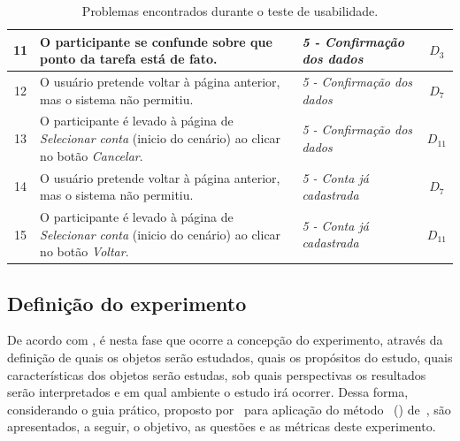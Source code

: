 \begin{table}[!htb]
\begin{center}
\begin{tabular}{|c|m{76mm}|m{48mm}|c|}
      11 & O  participante se confunde sobre que  ponto da tarefa está
      de fato.  & {\em 5 - Confirmação dos dados} & $D_{3}$ \\ \hline

      12 & O usuário pretende  voltar à página anterior, mas o sistema
      não  permitiu. &  {\em  5  - Confirmação  dos  dados} &  $D_{7}$
      \\ \hline

      13 & O participante é  levado à página de {\em Selecionar conta}
      (inicio do cenário) ao clicar no botão {\em Cancelar}.  & {\em 5
        - Confirmação dos dados} & $D_{11}$ \\ \hline

      14 & O usuário pretende  voltar à página anterior, mas o sistema
      não  permitiu.   & {\em  5  -  Conta  já cadastrada}  &  $D_{7}$
      \\ \hline

      15 & O participante é  levado à página de {\em Selecionar conta}
      (inicio do cenário) ao clicar no botão {\em Voltar}.  & {\em 5 -
        Conta já cadastrada} & $D_{11}$ \\ \hline

    \end{tabular}
    \caption{Problemas encontrados durante o teste de usabilidade.}
    \label{tab:testeProblemas}
  \end{center}
\end{table}

\subsection{Definição do experimento}
\label{experimentDefining}

De acordo com , é nesta fase que ocorre a
concepção  do experimento, através  da definição  de quais  os objetos
serão estudados, quais os  propósitos do estudo, quais características
dos objetos serão estudas,  sob quais perspectivas os resultados serão
interpretados e em  qual ambiente o estudo irá  ocorrer.  Dessa forma,
considerando         o          guia         prático,         proposto
por~   para  aplicação   do  método
\gqm\ ({\em \Gqm}) de~, são apresentados,
a seguir, o objetivo, as questões e as métricas deste experimento.

